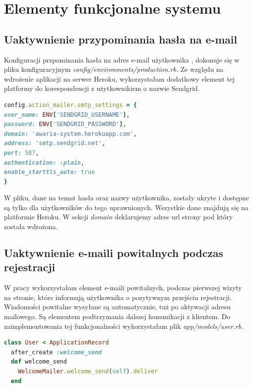 \documentclass[openright]{xmgr}
\begin{document}
	\chapter{Elementy funkcjonalne systemu}
	
	\section{Uaktywnienie przypominania hasła na e-mail}
	
	Konfiguracji przpominania hasła na adres e-mail użytkownika \cite{configuration}, dokonuje się w pliku konfiguracyjnym \textit{config/environments/production.rb.} Ze względu na wdrożenie aplikacji na serwer Heroku, wykorzystałam dodatkowy element tej platformy do korespondencji z użytkownikiem o nazwie Sendgrid.  
	
	\begin{lstlisting}[language=Ruby,lineskip={-1pt},caption=Konfiguracja pliku \textit{production.rb}]
config.action_mailer.smtp_settings = {
user_name: ENV['SENDGRID_USERNAME'],
password: ENV['SENDGRID_PASSWORD'],
domain: 'awaria-system.herokuapp.com',
address: 'smtp.sendgrid.net',
port: 587,
authentication: :plain,
enable_starttls_auto: true
}
	\end{lstlisting}
	
	W pliku, dane na temat hasła oraz nazwy użytkownika, zostały ukryte i dostępne są tylko dla użytkowników do tego uprawnionych. Wszystkie dane znajdują się na platformie Heroku. W sekcji \textit{domain} deklarujemy adres url strony pod który została wdrożona.
	\newpage
	\section{Uaktywnienie e-maili powitalnych podczas rejestracji}
	
	W pracy wykorzystałam element e-maili powitalnych, podczas pierwszej wizyty na stronie, które informują użytkownika o pozytywnym przejściu rejestracji. Wiadomości powitalne wysyłane są automatycznie, tuż po aktywacji adresu mailowego. Są elementem podtrzymania dalszej komunikacji z klientem. Do zaimplementowania tej funkcjonalności wykorzystałam plik \textit{app/models/user.rb.} 
	
	\begin{lstlisting}[language=Ruby,lineskip={-1pt},caption=Kod odpowiedzialny za wysyłanie e-mail powitalnych]
class User < ApplicationRecord
  after_create :welcome_send
  def welcome_send
	WelcomeMailer.welcome_send(self).deliver
  end
	\end{lstlisting}
	
\end{document}
